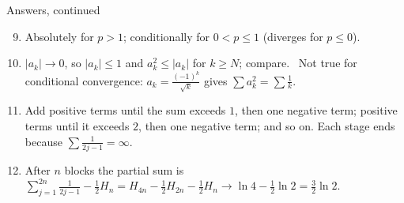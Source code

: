 \documentclass[10pt]{wosm-slides}
\begin{document}
\begin{frame}{Answers, continued}
  \small
  \begin{enumerate}
    \setcounter{enumi}{8}
    \item Absolutely for $p > 1$; conditionally for $0 < p \le 1$ (diverges for $p \le 0$).
    \item $|a_k| \to 0$, so $|a_k| \le 1$ and $a_k^2 \le |a_k|$ for $k \ge N$; compare. \
      Not true for conditional convergence: $a_k = \frac{(-1)^k}{\sqrt k}$ gives
      $\sum a_k^2 = \sum \frac1k$.
    \item Add positive terms until the sum exceeds $1$, then one negative term; positive
      terms until it exceeds $2$, then one negative term; and so on. Each stage ends because
      $\sum \frac{1}{2j-1} = \infty$.
    \item After $n$ blocks the partial sum is
      $\sum_{j=1}^{2n} \frac{1}{2j-1} - \frac12 H_n = H_{4n} - \frac12 H_{2n} - \frac12 H_n
       \to \ln 4 - \frac12 \ln 2 = \frac32 \ln 2$.
  \end{enumerate}
\end{frame}

\end{document}
